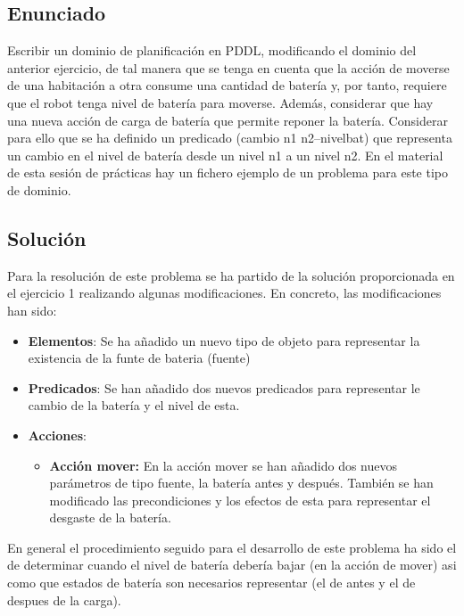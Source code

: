 \subsection{Enunciado}
Escribir un dominio de planificación
en  PDDL,  modificando el  dominio  del  anterior ejercicio, de tal manera  que  se  tenga  en  cuenta  que  la  acción  de  moverse  de  una habitación a otra consume una cantidad de batería y, por tanto, requiere que el robot tenga nivel de batería para moverse. Además, considerar que hay una nueva acción de carga  de  batería que  permite  reponer  la  batería.  Considerar  para  ello  que  se  ha definido un predicado (cambio n1 n2–nivelbat) que representa un cambio en el nivel de batería desde un nivel n1 a un nivel n2. En el material de esta sesión de prácticas hay un fichero ejemplo de un problema para este tipo de dominio.

\subsection{Solución}


Para la resolución de este problema se ha partido de la solución proporcionada en el ejercicio 1 realizando algunas modificaciones. En concreto, las modificaciones han sido:
\begin{itemize}

	\item \textbf{Elementos}: Se ha añadido un nuevo tipo de objeto para representar la existencia de la funte de bateria (fuente)

	\item \textbf{Predicados}: Se han añadido dos nuevos predicados para representar le cambio de la batería y el nivel de esta.
	
	\item \textbf{Acciones}: 

	\begin{itemize}
	
		\item \textbf{Acción mover:} En la acción mover se han añadido dos nuevos parámetros de tipo fuente, la batería antes y después. También se han modificado las precondiciones y los efectos de esta para representar el desgaste de la batería. 
		
	
	\end{itemize}	

	
\end{itemize}


	En general el procedimiento seguido para el desarrollo de este problema ha sido el de determinar cuando el nivel de batería debería bajar (en la acción de mover) asi como que estados de batería son necesarios representar (el de antes y el de despues de la carga). \\
	
